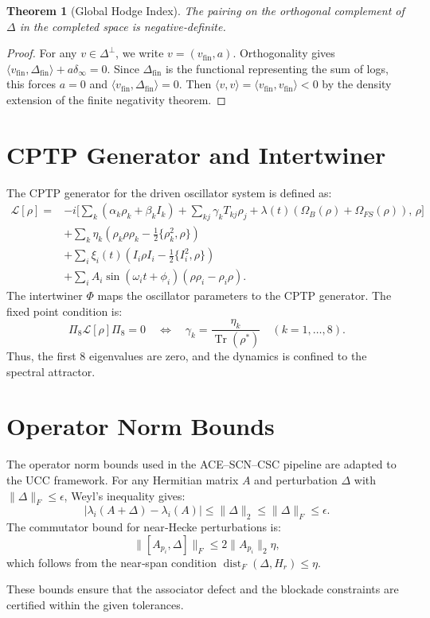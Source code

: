 \documentclass[11pt]{article}
\newcommand{\dist}{\operatorname{dist}}
\newtheorem{theorem}{Theorem}[section]
\begin{document}
\begin{theorem}[Global Hodge Index]
The pairing on the orthogonal complement of \( \Delta \) in the completed space is negative‑definite.
\end{theorem}

\begin{proof}
For any \( v \in \Delta^\perp \), we write \( v = (v_{\text{fin}}, a) \). Orthogonality gives \( \langle v_{\text{fin}}, \Delta_{\text{fin}}\rangle + a\delta_\infty = 0 \). Since \( \Delta_{\text{fin}} \) is the functional representing the sum of logs, this forces \( a=0 \) and \( \langle v_{\text{fin}}, \Delta_{\text{fin}}\rangle = 0 \). Then \( \langle v,v\rangle = \langle v_{\text{fin}}, v_{\text{fin}}\rangle < 0 \) by the density extension of the finite negativity theorem.
\end{proof}

\section{CPTP Generator and Intertwiner}
\label{sec:cptp}

The CPTP generator for the driven oscillator system is defined as:
\begin{align}
\mathcal{L}[\rho] = &-i\Big[\sum_k (\alpha_k \rho_k + \beta_k I_k) + \sum_{kj} \gamma_k T_{kj}\rho_j + \lambda(t)(\Omega_B(\rho)+\Omega_{FS}(\rho)),\,\rho\Big] \\
&+ \sum_k \eta_k \left(\rho_k \rho \rho_k - \frac12\{\rho_k^2,\rho\}\right) \\
&+ \sum_i \xi_i(t) \left(I_i \rho I_i - \frac12\{I_i^2,\rho\}\right) \\
&+ \sum_i A_i \sin(\omega_i t+\phi_i) \left(\rho \rho_i - \rho_i \rho\right).
\end{align}
The intertwiner \( \Phi \) maps the oscillator parameters to the CPTP generator. The fixed point condition is:
\[
\Pi_8 \mathcal{L}[\rho] \Pi_8 = 0 \quad \Longleftrightarrow \quad \gamma_k = \frac{\eta_k}{\operatorname{Tr}(\rho^*)} \quad (k=1,\dots,8).
\]
Thus, the first 8 eigenvalues are zero, and the dynamics is confined to the spectral attractor.

\section{Operator Norm Bounds}
\label{sec:operator-bounds}

The operator norm bounds used in the ACE–SCN–CSC pipeline are adapted to the UCC framework. For any Hermitian matrix \( A \) and perturbation \( \Delta \) with \( \|\Delta\|_F \le \epsilon \), Weyl's inequality gives:
\[
|\lambda_i(A+\Delta) - \lambda_i(A)| \le \|\Delta\|_2 \le \|\Delta\|_F \le \epsilon.
\]
The commutator bound for near‑Hecke perturbations is:
\[
\| [A_{p_i}, \Delta] \|_F \le 2 \| A_{p_i} \|_2 \eta,
\]
which follows from the near‑span condition \( \dist_F(\Delta, H_r) \le \eta \).

These bounds ensure that the associator defect and the blockade constraints are certified within the given tolerances.


\nocite{*}
  

\end{document}
